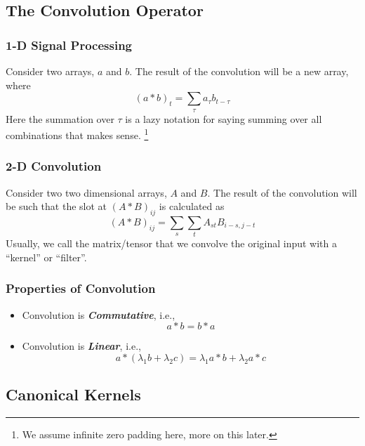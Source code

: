\documentclass[11pt]{article}
\begin{document}
\subsection{The Convolution Operator}
\subsubsection{1-D Signal Processing} Consider two arrays, $a$ and $b$. The result of the convolution will be a new array, where
\begin{equation}
    (a * b)_{t}=\sum_{\tau} a_{\tau} b_{t-\tau}
\end{equation}
Here the summation over $\tau$ is a lazy notation for saying summing over all combinations that makes sense. \footnote{We assume infinite zero padding here, more on this later.}

\subsubsection{2-D Convolution}
Consider two two dimensional arrays, $A$ and $B$. The result of the convolution will be such that the slot at $(A\ast B)_{ij}$ is calculated as
\begin{equation}
    (A * B)_{i j}=\sum_{s} \sum_{t} A_{s t} B_{i-s, j-t}
\end{equation}
Usually, we call the matrix/tensor that we convolve the original input with a ``kernel'' or ``filter''. 

\subsubsection{Properties of Convolution}
\begin{itemize}
    \item Convolution is \textit{\textbf{Commutative}}, i.e.,
        \begin{equation}
            a * b=b * a
        \end{equation} 
    \item Convolution is \textit{\textbf{Linear}}, i.e., 
        \begin{equation}
            a *\left(\lambda_{1} b+\lambda_{2} c\right)=\lambda_{1} a * b+\lambda_{2} a * c
        \end{equation}
\end{itemize}

\subsection{Canonical Kernels}
\end{document}
